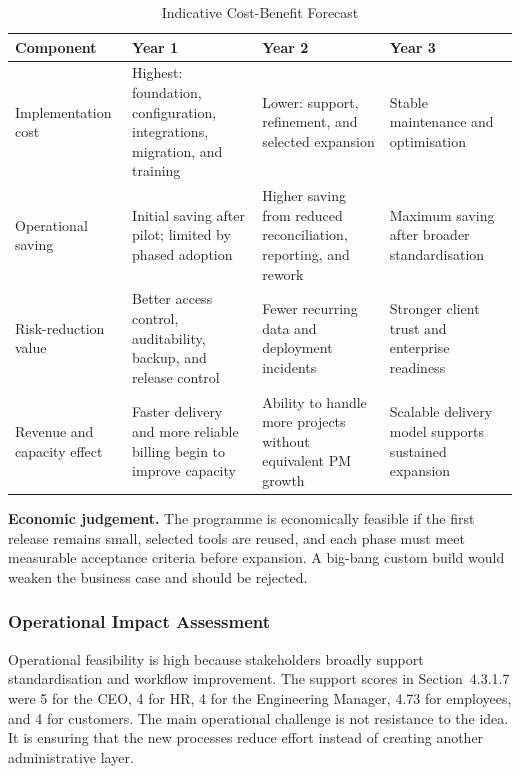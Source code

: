 \documentclass[12pt,a4paper]{report}
\begin{document}
\begin{table}[H]
\centering
\caption{Indicative Cost-Benefit Forecast}
\label{tab:cost-benefit-forecast}
\scriptsize
\renewcommand{\arraystretch}{1.10}
\begin{tabularx}{\textwidth}{>{\raggedright\arraybackslash}p{3.3cm}
                                >{\raggedright\arraybackslash}X
                                >{\raggedright\arraybackslash}X
                                >{\raggedright\arraybackslash}X}
\toprule
\textbf{Component} & \textbf{Year 1} & \textbf{Year 2} & \textbf{Year 3} \\
\midrule
Implementation cost & Highest: foundation, configuration, integrations, migration, and training & Lower: support, refinement, and selected expansion & Stable maintenance and optimisation \\
Operational saving & Initial saving after pilot; limited by phased adoption & Higher saving from reduced reconciliation, reporting, and rework & Maximum saving after broader standardisation \\
Risk-reduction value & Better access control, auditability, backup, and release control & Fewer recurring data and deployment incidents & Stronger client trust and enterprise readiness \\
Revenue and capacity effect & Faster delivery and more reliable billing begin to improve capacity & Ability to handle more projects without equivalent PM growth & Scalable delivery model supports sustained expansion \\
\bottomrule
\end{tabularx}
\end{table}

\textbf{Economic judgement.}
The programme is economically feasible if the first release remains small, selected tools are
reused, and each phase must meet measurable acceptance criteria before expansion. A big-bang
custom build would weaken the business case and should be rejected.

\subsubsection{Operational Impact Assessment}\label{sec:feas-operational}

Operational feasibility is high because stakeholders broadly support standardisation and
workflow improvement. The support scores in Section~4.3.1.7 were 5 for the CEO, 4 for HR,
4 for the Engineering Manager, 4.73 for employees, and 4 for customers. The main operational
challenge is not resistance to the idea. It is ensuring that the new processes reduce effort instead
of creating another administrative layer.
\end{document}
